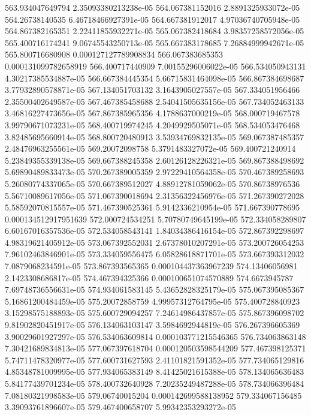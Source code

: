 {563.934047649794 2.35093380213238e-05
564.067381152016 2.8891325933072e-05
564.26738140535 6.46718466927391e-05
564.667381912017 4.97036740705948e-05
564.867382165351 2.22411855932271e-05
565.067382418684 3.98357258572056e-05
565.400716174241 9.06745543250713e-05
565.667383178685 7.26884999942671e-05
565.800716680908 0.000127127789908834
566.067383685353 0.000131099782658919
566.400717440909 7.00155296006022e-05
566.534050943131 4.30217385534887e-05
566.667384445354 5.66715831464098e-05
566.867384698687 3.77932890578871e-05
567.134051703132 3.1643905027557e-05
567.334051956466 2.35500402649587e-05
567.467385458688 2.54041505635156e-05
567.734052463133 3.46816227473656e-05
567.867385965356 4.1788637000219e-05
568.000719467578 3.99790671073231e-05
568.400719974245 4.2049929505071e-05
568.534053476468 3.82485695660914e-05
568.800720480913 3.53934769832135e-05
569.067387485357 2.48476963255561e-05
569.20072098758 5.3791483327072e-05
569.400721240914 5.23849355339138e-05
569.667388245358 2.60126128226321e-05
569.867388498692 5.69890489833473e-05
570.267389005359 2.97229410564358e-05
570.467389258693 5.26080774337065e-05
570.667389512027 4.88912781059062e-05
570.86738976536 5.56710089617056e-05
571.067390018694 2.31356322456976e-05
571.267390272028 5.58592070815557e-05
571.467390525361 5.9142336210954e-05
571.667390778695 0.000134512917951639
572.000724534251 5.70780749645199e-05
572.334058289807 6.60167016357536e-05
572.534058543141 1.84034386416154e-05
572.867392298697 4.98319621405912e-05
573.067392552031 2.67378010207291e-05
573.200726054253 7.96102463846901e-05
573.334059556475 6.05828618871701e-05
573.667393312032 7.0879068234591e-05
573.867393565365 0.000104437363967239
574.13406056981 2.1423308686817e-05
574.467394325366 0.000100651074570889
574.6673945787 7.69748736556631e-05
574.934061583145 5.43652828325179e-05
575.067395085367 5.16861200484459e-05
575.20072858759 4.99957312764795e-05
575.400728840923 3.15298575188893e-05
575.600729094257 7.24614986437857e-05
575.867396098702 9.81902820451917e-05
576.134063103147 3.5984692944819e-05
576.267396605369 3.90029601927297e-05
576.534063609814 0.000103771215546365
576.734063863148 7.30421689834813e-05
577.067397618704 0.000120503598544209
577.467398125371 5.74711478320977e-05
577.600731627593 2.41101821591352e-05
577.734065129816 4.85348781009995e-05
577.934065383149 8.41425021615388e-05
578.134065636483 5.84177439701234e-05
578.400732640928 7.20235249487288e-05
578.734066396484 7.08180321998583e-05
579.06740015204 0.000142699588138952
579.334067156485 3.39093761896607e-05
579.467400658707 5.99342353293272e-05
}
